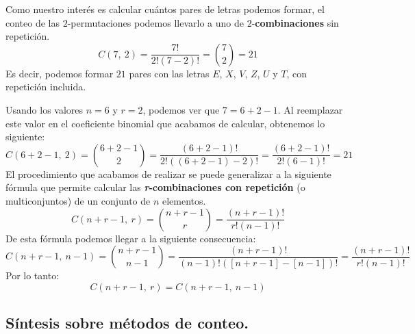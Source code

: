 \documentclass[12pt]{article}
\begin{document}
\begin{figure}[hbt!]
\centering


\end{figure}

Como nuestro interés es calcular cuántos pares de letras podemos formar, el conteo de las $2$-permutaciones podemos llevarlo a uno de $2$-\textbf{combinaciones} sin repetición.
\[
  C(7, \ 2) = \frac{7!}{2! (7 - 2)!} = \binom{7}{2} = 21
\]
Es decir, podemos formar $21$ pares con las letras $E$, $X$, $V$, $Z$, $U$ y $T$, con repetición incluida.

Usando los valores $n = 6$ y $r = 2$, podemos ver que $7 = 6 + 2 - 1$. Al reemplazar este valor en el coeficiente binomial que acabamos de calcular, obtenemos lo siguiente:
\[
  C(6 + 2 - 1, \ 2) = \binom{6 + 2 - 1}{2}
                    = \frac{(6 + 2 - 1)!}{2! ((6 + 2 - 1) - 2)!}
                    = \frac{(6 + 2 - 1)!}{2! (6 - 1)!}
                    = 21
\]
El procedimiento que acabamos de realizar se puede generalizar a la siguiente fórmula que permite calcular las \textbf{\textit{r}-combinaciones con repetición} (o multiconjuntos) de un conjunto de $n$ elementos.
\[
  C(n + r - 1, \ r) = \binom{n + r - 1}{r} = \frac{(n + r - 1)!}{r!(n - 1)!}
\]
De esta fórmula podemos llegar a la siguiente consecuencia:
\[
  C(n + r - 1, \ n - 1) = \binom{n + r - 1}{n - 1}
                        = \frac{(n + r - 1)!}{(n - 1)!([n + r - 1] - [n - 1])!}
                        = \frac{(n + r - 1)!}{r!(n - 1)!}
\]
Por lo tanto:
\[
  C(n + r - 1, \ r) = C(n + r - 1, \ n - 1)
\]

\subsection{Síntesis sobre métodos de conteo.}
\end{document}
